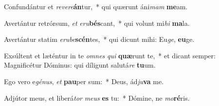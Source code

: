 \item Confundántur et \textit{re}\textit{ve}\textit{re}\textbf{án}tur,~* qui quærunt áni\textit{mam} \textbf{me}am.
\item Avertántur retrórsum, \textit{et} \textit{e}\textit{ru}\textbf{bés}cant,~* qui volunt mi\textit{hi} \textbf{ma}la.
\item Avertántur statim \textit{e}\textit{ru}\textit{be}\textbf{scén}tes,~* qui dicunt mihi: Eu\textit{ge}, \textbf{eu}ge.
\item Exsúltent et læténtur in te \textit{om}\textit{nes} \textit{qui} \textbf{quæ}runt te,~* et dicant semper: Magnificétur Dóminus: qui díligunt salutá\textit{re} \textbf{tu}um.
\item Ego vero e\textit{gé}\textit{nus}, \textit{et} \textbf{pau}per sum:~* Deus, ád\textit{ju}\textbf{va} me.
\item Adjútor meus, et liberá\textit{tor} \textit{me}\textit{us} \textbf{es} tu:~* Dómine, ne \textit{mo}\textbf{ré}ris.

